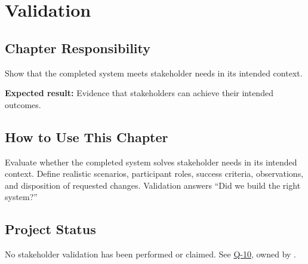 \chapter{Validation}
\section{Chapter Responsibility}
\label{Section:ValidationResponsibility}
Show that the completed system meets stakeholder needs in its intended context.

\noindent\textbf{Expected result:} Evidence that stakeholders can achieve their intended outcomes.

\section{How to Use This Chapter}
Evaluate whether the completed system solves stakeholder needs in its intended context. Define realistic scenarios, participant roles, success criteria, observations, and disposition of requested changes.
Validation answers ``Did we build the right system?''


\section{Project Status}
No stakeholder validation has been performed or claimed.
See \hyperref[Question:Q-10]{Q-10}, owned by \DocumentOwner.
